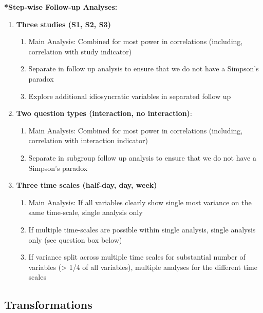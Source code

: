 \documentclass[]{article}
\newcounter{question}
\begin{document}
\textbf{*Step-wise Follow-up Analyses:}

\begin{enumerate}
  \item \textbf{Three studies (S1, S2, S3)}
    \begin{enumerate}
      \item Main Analysis: Combined for most power in correlations (including, correlation with study indicator)
      \item Separate in follow up analysis to ensure that we do not have a Simpson's paradox
      \item Explore additional idiosyncratic variables in separated follow up
    \end{enumerate}
  \item \textbf{Two question types (interaction, no interaction)}:
    \begin{enumerate}
      \item Main Analysis: Combined for most power in correlations (including, correlation with interaction indicator)
      \item Separate in subgroup follow up analysis to ensure that we do not have a Simpson's paradox
    \end{enumerate}
  \item \textbf{Three time scales (half-day, day, week)}
    \begin{enumerate}
      \item Main Analysis: If all variables clearly show single most variance on the same time-scale, single analysis only
      \item If multiple time-scales are possible within single analysis, single analysis only (see question box below)
      \item If variance split across multiple time scales for substantial number of variables (> 1/4 of all variables), multiple analyses for the different time scales 
    \end{enumerate}
\end{enumerate}

\hypertarget{transformations}{%
\subsection{Transformations}\label{transformations}}

\setlength{\abovedisplayskip}{0pt}
\setlength{\belowdisplayskip}{0pt}
\setlength{\abovedisplayshortskip}{0pt}
\setlength{\belowdisplayshortskip}{0pt}
\end{document}
